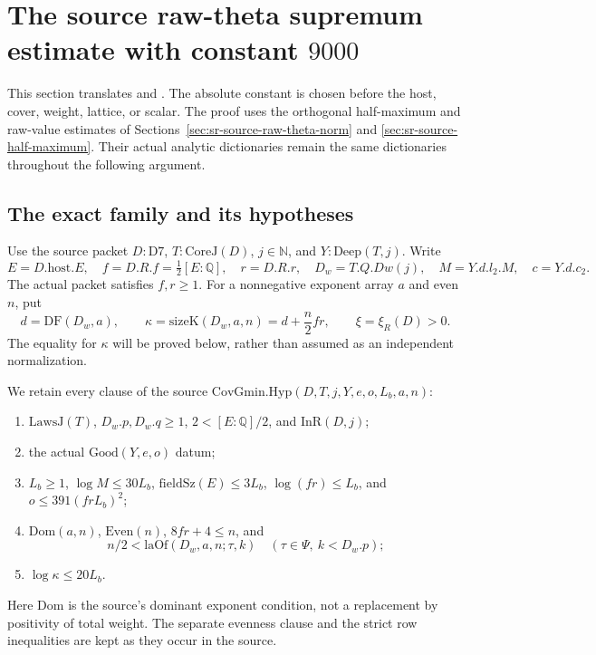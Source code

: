 \section{The source raw-theta supremum estimate with constant \(9000\)}
\label{sec:sr-source-raw-sup-9000}

This section translates  and
.  The absolute constant is chosen before
the host, cover, weight, lattice, or scalar.  The proof uses the
orthogonal half-maximum and raw-value estimates of
Sections~\ref{sec:sr-source-raw-theta-norm} and
\ref{sec:sr-source-half-maximum}.  Their actual analytic dictionaries
remain the same dictionaries throughout the following argument.

\subsection{The exact family and its hypotheses}
Use the source packet \(D:\mathrm{D7}\), \(T:\mathrm{CoreJ}(D)\),
\(j\in\mathbb N\), and \(Y:\mathrm{Deep}(T,j)\).
Write
\[
 E=D.\mathrm{host}.E,\quad f=D.R.f=\tfrac12[E:\mathbb Q],\quad
 r=D.R.r,\quad D_w=T.Q.Dw(j),\quad M=Y.d.l_2.M,\quad
 c=Y.d.c_2 .
\]
The actual packet satisfies \(f,r\ge1\).
For a nonnegative exponent array \(a\) and even \(n\), put
\[
 d=\mathrm{DF}(D_w,a),\qquad
 \kappa=\mathrm{sizeK}(D_w,a,n)
             =d+\frac n2fr,\qquad \xi=\xi_R(D)>0.
 \tag{RN1}\label{eq:sr-source-raw-size}
\]
The equality for \(\kappa\) will be proved below, rather than
assumed as an independent normalization.

We retain every clause of the source
\(\mathrm{CovGmin.Hyp}(D,T,j,Y,e,o,L_b,a,n)\):
\begin{enumerate}
\item \(\mathrm{LawsJ}(T)\), \(D_w.p,D_w.q\ge1\),
\(2<[E:\mathbb Q]/2\), and \(\mathrm{InR}(D,j)\);
\item the actual \(\mathrm{Good}(Y,e,o)\) datum;
\item \(L_b\ge1\),
\(\log M\le30L_b\), \(\mathrm{fieldSz}(E)\le3L_b\),
\(\log(fr)\le L_b\), and \(o\le391(frL_b)^2\);
\item \(\mathrm{Dom}(a,n)\), \(\mathrm{Even}(n)\),
\(8fr+4\le n\), and
\[
  n/2<\mathrm{laOf}(D_w,a,n;\tau,k)
       \quad(\tau\in\Psi,\ k<D_w.p);
\]
\item \(\log\kappa\le20L_b\).
\end{enumerate}
Here \(\mathrm{Dom}\) is the source's dominant exponent condition,
not a replacement by positivity of total weight.
The separate evenness clause and the strict row inequalities are
kept as they occur in the source.

